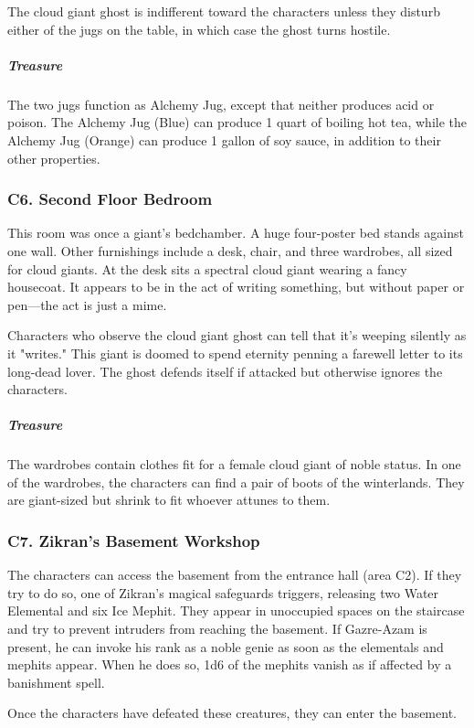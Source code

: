 \documentclass[10pt,a4paper,twoside,bg=print,twocolumn,openany,nodeprecatedcode]{dndbook}
\begin{document}
The cloud giant ghost is indifferent toward the characters unless they disturb either of the jugs on the table, in which case the ghost turns hostile.

\subparagraph{Treasure}
The two jugs function as Alchemy Jug, except that neither produces acid or poison. The Alchemy Jug (Blue) can produce 1 quart of boiling hot tea, while the Alchemy Jug (Orange) can produce 1 gallon of soy sauce, in addition to their other properties.

\subsubsection{C6. Second Floor Bedroom}
\begin{DndReadAloud}{}
This room was once a giant's bedchamber. A huge four-poster bed stands against one wall. Other furnishings include a desk, chair, and three wardrobes, all sized for cloud giants. At the desk sits a spectral cloud giant wearing a fancy housecoat. It appears to be in the act of writing something, but without paper or pen—the act is just a mime.

\end{DndReadAloud}

Characters who observe the cloud giant ghost can tell that it's weeping silently as it "writes." This giant is doomed to spend eternity penning a farewell letter to its long-dead lover. The ghost defends itself if attacked but otherwise ignores the characters.

\subparagraph{Treasure}
The wardrobes contain clothes fit for a female cloud giant of noble status. In one of the wardrobes, the characters can find a pair of boots of the winterlands. They are giant-sized but shrink to fit whoever attunes to them.

\subsubsection{C7. Zikran's Basement Workshop}
The characters can access the basement from the entrance hall (area C2). If they try to do so, one of Zikran's magical safeguards triggers, releasing two Water Elemental and six Ice Mephit. They appear in unoccupied spaces on the staircase and try to prevent intruders from reaching the basement. If Gazre-Azam is present, he can invoke his rank as a noble genie as soon as the elementals and mephits appear. When he does so, 1d6 of the mephits vanish as if affected by a banishment spell.

Once the characters have defeated these creatures, they can enter the basement.
\end{document}
